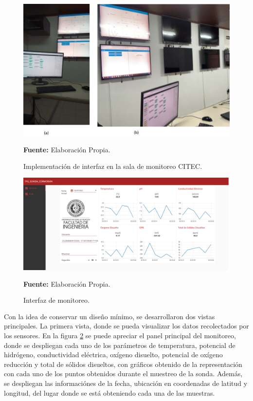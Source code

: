 \begin{figure}[H]
        \centering
        \includegraphics[scale=0.7]{Imagenes/cap4/SalaMonitoreo.jpg}
        \caption {Implementaci\'on de interfaz en la sala de monitoreo CITEC. }{\textbf{Fuente:}
        Elaboraci\'on Propia. }
        \label{fig:Monitoreo}
\end{figure}


\begin{figure}[H]
        \centering
        \includegraphics[scale=0.88]{Imagenes/cap4/nodeRed.png}
        \caption {Interfaz de monitoreo. }{\textbf{Fuente:}
        Elaboraci\'on Propia. }
        \label{fig:interfaz}
\end{figure}

Con la idea de conservar un dise\~no m\'inimo, se desarrollaron dos vistas principales. 
La primera vista, donde se pueda visualizar los datos recolectados por los sensores. 
En la figura \ref{fig:interfaz} se puede apreciar el panel principal del monitoreo, donde se despliegan cada uno de los parámetros de temperatura, potencial de hidrógeno, conductividad eléctrica, ox\'igeno disuelto, potencial de ox\'igeno reducción y total de s\'olidos disueltos, con gráficos obtenido de la representaci\'on  con cada uno de los puntos obtenidos durante el muestreo de la sonda. 
Además, se despliegan las informaci\'ones de la fecha, ubicación en coordenadas de latitud y longitud, del lugar donde se est\'a obteniendo cada una de las muestras.

